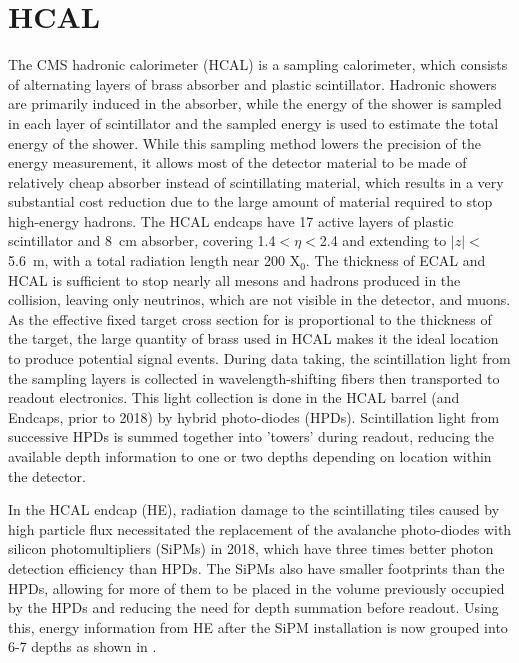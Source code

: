 \section{HCAL}
The CMS hadronic calorimeter (HCAL) is a sampling calorimeter, which consists of alternating layers of brass absorber and plastic scintillator. 
Hadronic showers are primarily induced in the absorber, while the energy of the shower is sampled in each layer of scintillator and the sampled energy is used to estimate the total energy of the shower. 
While this sampling method lowers the precision of the energy measurement, it allows most of the detector material to be made of relatively cheap absorber instead of scintillating material, which results in a very substantial cost reduction due to the large amount of material required to stop high-energy hadrons.
The HCAL endcaps have 17 active layers of plastic scintillator and \SI{8}{\centi\meter} absorber, covering 1.4$<\eta<$2.4 and extending to $\lvert z \rvert<$ \SI{5.6}{\meter}, with a total radiation length near 200 X$_0$. 
The thickness of ECAL and HCAL is sufficient to stop nearly all mesons and hadrons produced in the collision, leaving only neutrinos, which are not visible in the detector, and muons. 
As the effective fixed target cross section for \dbrem is proportional to the thickness of the target, the large quantity of brass used in HCAL makes it the ideal location to produce potential signal events.
During data taking, the scintillation light from the sampling layers is collected in wavelength-shifting fibers then transported to readout electronics.
This light collection is done in the HCAL barrel (and Endcaps, prior to 2018) by hybrid photo-diodes (HPDs). 
Scintillation light from successive HPDs is summed together into 'towers' during readout, reducing the available depth information to one or two depths depending on location within the detector.

In the HCAL endcap (HE), radiation damage to the scintillating tiles caused by high particle flux necessitated the replacement of the avalanche photo-diodes with silicon photomultipliers (SiPMs) in 2018, which have three times better photon detection efficiency than HPDs.  
The SiPMs also have smaller footprints than the HPDs, allowing for more of them to be placed in the volume previously occupied by the HPDs and reducing the need for depth summation before readout. 
Using this, energy information from HE after the SiPM installation is now grouped into 6-7 depths as shown in .

